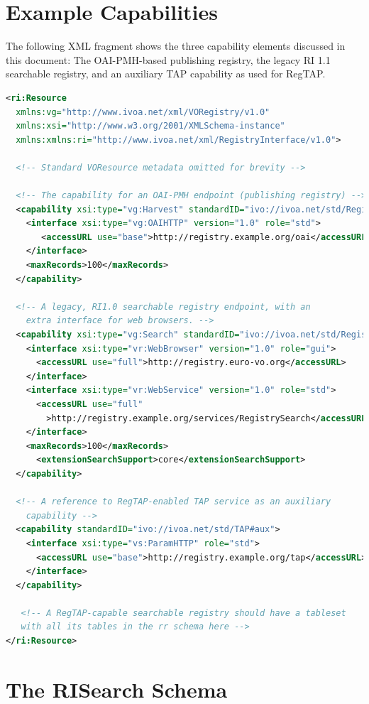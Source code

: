 \documentclass{ivoa}
\begin{document}
\section{Example Capabilities}
\label{sect:exampleCap}

The following XML fragment shows the three capability elements discussed
in this document: The OAI-PMH-based publishing registry, the legacy 
RI 1.1 searchable registry, and an auxiliary TAP capability as used
for RegTAP.

\begin{lstlisting}[language=XML,basicstyle=\footnotesize]
<ri:Resource
  xmlns:vg="http://www.ivoa.net/xml/VORegistry/v1.0" 
  xmlns:xsi="http://www.w3.org/2001/XMLSchema-instance"
  xmlns:xmlns:ri="http://www.ivoa.net/xml/RegistryInterface/v1.0">

  <!-- Standard VOResource metadata omitted for brevity -->

  <!-- The capability for an OAI-PMH endpoint (publishing registry) -->
  <capability xsi:type="vg:Harvest" standardID="ivo://ivoa.net/std/Registry">
    <interface xsi:type="vg:OAIHTTP" version="1.0" role="std">
       <accessURL use="base">http://registry.example.org/oai</accessURL>
    </interface>
    <maxRecords>100</maxRecords>
  </capability>

  <!-- A legacy, RI1.0 searchable registry endpoint, with an
    extra interface for web browsers. -->
  <capability xsi:type="vg:Search" standardID="ivo://ivoa.net/std/Registry">
    <interface xsi:type="vr:WebBrowser" version="1.0" role="gui">
      <accessURL use="full">http://registry.euro-vo.org</accessURL>
    </interface>
    <interface xsi:type="vr:WebService" version="1.0" role="std">
      <accessURL use="full"
        >http://registry.example.org/services/RegistrySearch</accessURL>
    </interface>
    <maxRecords>100</maxRecords>
      <extensionSearchSupport>core</extensionSearchSupport>
  </capability>

  <!-- A reference to RegTAP-enabled TAP service as an auxiliary
    capability -->
  <capability standardID="ivo://ivoa.net/std/TAP#aux">
    <interface xsi:type="vs:ParamHTTP" role="std">
      <accessURL use="base">http://registry.example.org/tap</accessURL>
    </interface>
  </capability>

   <!-- A RegTAP-capable searchable registry should have a tableset
   with all its tables in the rr schema here -->
</ri:Resource>
\end{lstlisting}

\section{The RISearch Schema}
\label{app:RISearch}
\end{document}
